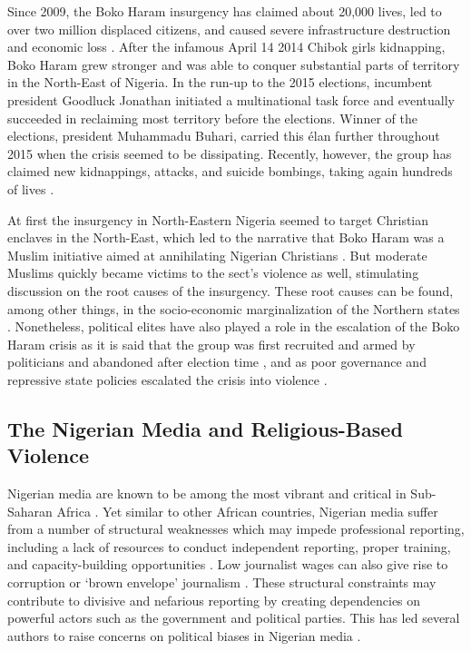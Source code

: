 Since 2009, the Boko Haram insurgency has claimed about 20,000 lives, led to over two million displaced citizens, and caused severe infrastructure destruction and economic loss \citep{GCT2018}. After the infamous April 14 2014 Chibok girls kidnapping, Boko Haram grew stronger and was able to conquer substantial parts of territory in the North-East of Nigeria. In the run-up to the 2015 elections, incumbent president Goodluck Jonathan initiated a multinational task force and eventually succeeded in reclaiming most territory before the elections. Winner of the elections, president Muhammadu Buhari, carried this \'{e}lan further throughout 2015 when the crisis seemed to be dissipating. Recently, however, the group has claimed new kidnappings, attacks, and suicide bombings, taking again hundreds of lives \citep{AmnestyInternational2018}. 


At first the insurgency in North-Eastern Nigeria seemed to target Christian enclaves in the North-East, which led to the narrative that Boko Haram was a Muslim initiative aimed at annihilating Nigerian Christians \citep{PerousedeMontclos2015}. But moderate Muslims quickly became victims to the sect's violence as well, stimulating discussion on the root causes of the insurgency. These root causes can be found, among other things, in the socio-economic marginalization of the Northern states \citep{Langer2017c}. Nonetheless, political elites have also played a role in the escalation of the Boko Haram crisis as it is said that the group was first recruited and armed by politicians and abandoned after election time \citep[][p. 227]{Kendhammer2016}, and as poor governance and repressive state policies escalated the crisis into violence \citep[][see also Appendix \ref{app:A2}]{Mustapha2014b, PerousedeMontclos2015}.


\subsection{The Nigerian Media and Religious-Based Violence}
\label{sec:432}
Nigerian media are known to be among the most vibrant and critical in Sub-Saharan Africa \citep{FreedomHouse2017}. Yet similar to other African countries, Nigerian media suffer from a number of structural weaknesses which may impede professional reporting, including a lack of resources to conduct independent reporting, proper training, and capacity-building opportunities \citep{Frere2001}. Low journalist wages can also give rise to corruption or `brown envelope' journalism \citep{Lodamo2009}. These structural constraints may contribute to divisive and nefarious reporting by creating dependencies on powerful actors such as the government and political parties. This has led several authors to raise concerns on political biases in Nigerian media \citep[e.g.,][]{Ette2018}.


